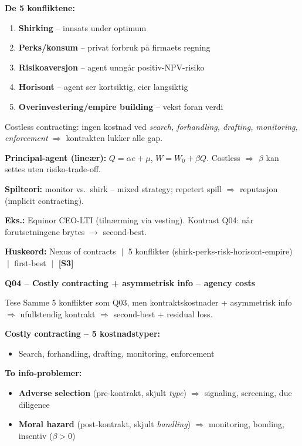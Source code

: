 \documentclass[10pt, a4paper]{article}
\newcommand{\SThree}{\textcolor{s3color}{\textbf{[S3]}}}
\newcommand{\qhead}[2]{%
  \noindent
  \begin{tcolorbox}[colback=boxborder, colframe=boxborder, arc=2pt, left=6pt, right=6pt, top=2pt, bottom=2pt]
    \color{white}\textbf{\large Q#1 -- #2}
  \end{tcolorbox}
}
\newcommand{\huskeord}[1]{%
  \vspace{2pt}
  \begin{tcolorbox}[colback=yellow!15, colframe=orange!70!black, boxrule=0.4pt, arc=2pt, left=4pt, right=4pt, top=2pt, bottom=2pt]
    \footnotesize\textbf{Huskeord:} #1
  \end{tcolorbox}
}
\begin{document}
\textbf{De 5 konfliktene:}
\begin{enumerate}
  \item \textbf{Shirking} -- innsats under optimum
  \item \textbf{Perks/konsum} -- privat forbruk på firmaets regning
  \item \textbf{Risikoaversjon} -- agent unngår positiv-NPV-risiko
  \item \textbf{Horisont} -- agent ser kortsiktig, eier langsiktig
  \item \textbf{Overinvestering/empire building} -- vekst foran verdi
\end{enumerate}

\begin{formulabox}
Costless contracting: ingen kostnad ved \emph{search, forhandling, drafting, monitoring, enforcement} $\Rightarrow$ kontrakten lukker alle gap.
\end{formulabox}

\textbf{Principal-agent (lineær):} $Q=\alpha e + \mu$, $W = W_0 + \beta Q$. Costless $\Rightarrow$ $\beta$ kan settes uten risiko-trade-off.

\textbf{Spilteori:} monitor vs.\ shirk -- mixed strategy; repetert spill $\Rightarrow$ reputasjon (implicit contracting).

\textbf{Eks.:} Equinor CEO-LTI (tilnærming via vesting). Kontrast Q04: når forutsetningene brytes $\to$ second-best.

\huskeord{Nexus of contracts $\;\big|\;$ 5 konflikter (shirk-perks-risk-horisont-empire) $\;\big|\;$ first-best $\;\big|\;$ \SThree}

\vfill\newpage

\qhead{04}{Costly contracting + asymmetrisk info -- agency costs}

\begin{keybox}{Tese}
Samme 5 konflikter som Q03, men kontraktskostnader + asymmetrisk info $\Rightarrow$ ufullstendig kontrakt $\Rightarrow$ second-best + residual loss.
\end{keybox}

\textbf{Costly contracting -- 5 kostnadstyper:}
\begin{itemize}
  \item Search, forhandling, drafting, monitoring, enforcement
\end{itemize}

\textbf{To info-problemer:}
\begin{itemize}
  \item \textbf{Adverse selection} (pre-kontrakt, skjult \emph{type}) $\Rightarrow$ signaling, screening, due diligence
  \item \textbf{Moral hazard} (post-kontrakt, skjult \emph{handling}) $\Rightarrow$ monitoring, bonding, insentiv ($\beta > 0$)
\end{itemize}
\end{document}
